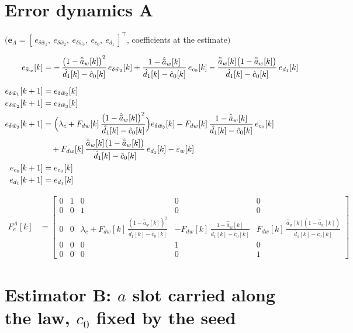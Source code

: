 \documentclass[11pt,a4paper,fontset=none]{ctexart}
\newcommand{\ba}{\bar{a}}
\newcommand{\bw}{\bar{w}}
\newcommand{\ah}{\hat{\ba}_w}
\newcommand{\ch}{\hat{c}_0}
\newcommand{\dhat}{\hat{d}_1}
\begin{document}
\section{Error dynamics A}

$\bigl(\mathbf{e}_A = [\,e_{\delta\bw_1},\ e_{\delta\bw_2},\ e_{\delta\bw_3},\ e_{c_0},\ e_{d_1}\,]^{\top}$, coefficients at the estimate$\bigr)$

\begin{align*}
e_{\ba_w}[k]         &= -\,\frac{\bigl(1-\ah[k]\bigr)^{2}}{\dhat[k] - \ch[k]}\,e_{\delta\bw_3}[k]
                        + \frac{1-\ah[k]}{\dhat[k] - \ch[k]}\,e_{c_0}[k]
                        - \frac{\ah[k]\bigl(1-\ah[k]\bigr)}{\dhat[k] - \ch[k]}\,e_{d_1}[k] \\[6pt]
e_{\delta\bw_1}[k+1] &= e_{\delta\bw_2}[k] \\
e_{\delta\bw_2}[k+1] &= e_{\delta\bw_3}[k] \\
e_{\delta\bw_3}[k+1] &= \Bigl(\lambda_c + F_{dw}[k]\,\frac{\bigl(1-\ah[k]\bigr)^{2}}{\dhat[k] - \ch[k]}\Bigr)e_{\delta\bw_3}[k]
                        - F_{dw}[k]\,\frac{1-\ah[k]}{\dhat[k] - \ch[k]}\,e_{c_0}[k] \\
                     &\quad + F_{dw}[k]\,\frac{\ah[k]\bigl(1-\ah[k]\bigr)}{\dhat[k] - \ch[k]}\,e_{d_1}[k] - \varepsilon_w[k] \\
e_{c_0}[k+1]         &= e_{c_0}[k] \\
e_{d_1}[k+1]         &= e_{d_1}[k]
\end{align*}

{\footnotesize\setlength{\arraycolsep}{2pt}
\begin{align*}
F_e^{A}[k] &= \begin{bmatrix}
0 & 1 & 0 & 0 & 0 \\
0 & 0 & 1 & 0 & 0 \\
0 & 0 & \lambda_c + F_{dw}[k]\,\frac{(1-\ah[k])^{2}}{\dhat[k] - \ch[k]}
      & -F_{dw}[k]\,\frac{1-\ah[k]}{\dhat[k] - \ch[k]}
      & F_{dw}[k]\,\frac{\ah[k](1-\ah[k])}{\dhat[k] - \ch[k]} \\
0 & 0 & 0 & 1 & 0 \\
0 & 0 & 0 & 0 & 1
\end{bmatrix}
\end{align*}}

\section{Estimator B: $a$ slot carried along the law, $c_0$ fixed by the seed}
\end{document}
